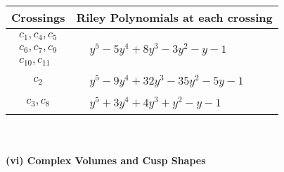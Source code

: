 \documentclass[1p]{elsarticle_modified}
\theoremstyle{definition}
\begin{document}
\begin{tabular}{m{50pt}|m{274pt}}
Crossings & \hspace{64pt}Riley Polynomials at each crossing \\
\hline $$\begin{aligned}c_{1},c_{4},c_{5}\\c_{6},c_{7},c_{9}\\c_{10},c_{11}\end{aligned}$$&$\begin{aligned}
&y^5-5 y^4+8 y^3-3 y^2- y-1
\end{aligned}$\\
\hline $$\begin{aligned}c_{2}\end{aligned}$$&$\begin{aligned}
&y^5-9 y^4+32 y^3-35 y^2-5 y-1
\end{aligned}$\\
\hline $$\begin{aligned}c_{3},c_{8}\end{aligned}$$&$\begin{aligned}
&y^5+3 y^4+4 y^3+y^2- y-1
\end{aligned}$\\
\hline
\end{tabular}\\~\\
\newpage\flushleft \textbf{(vi) Complex Volumes and Cusp Shapes}
\end{document}
